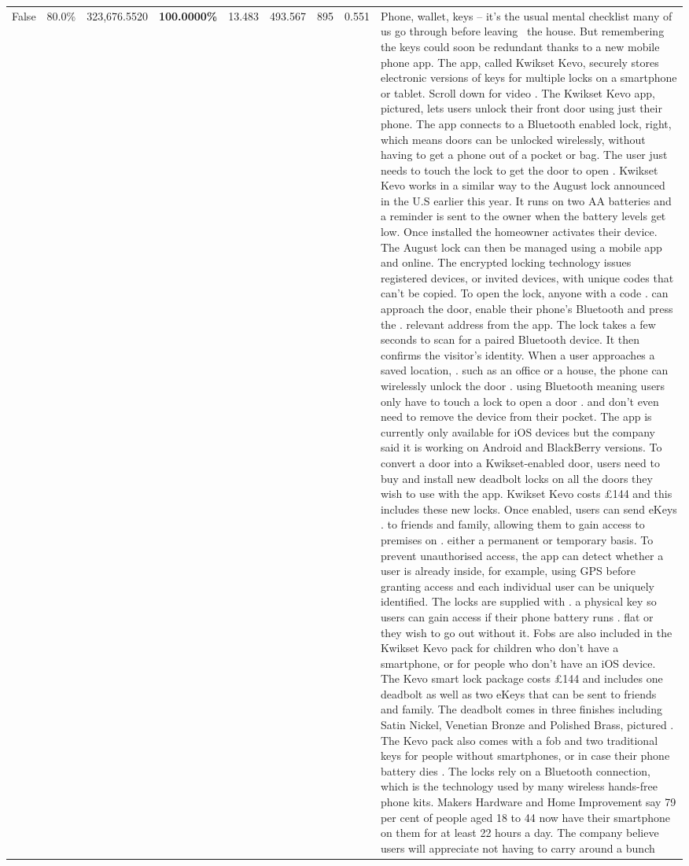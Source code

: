 \begin{table}[H]
\begin{tabular}{lllrlllll}
False & 80.0\% & 323,676.5520 & \bfseries \color{red} 100.0000\% & 13.483 & 493.567 & 895 & 0.551 & Phone, wallet, keys – it’s the usual mental checklist many of us go through before leaving  the house. But remembering the keys could soon be redundant thanks to a new mobile phone app. The app, called Kwikset Kevo, securely stores electronic versions of keys for multiple locks on a smartphone or tablet. Scroll down for video . The Kwikset Kevo app, pictured, lets users unlock their front door using just their phone. The app connects to a Bluetooth enabled lock, right, which means doors can be unlocked wirelessly, without having to get a phone out of a pocket or bag. The user just needs to touch the lock to get the door to open . Kwikset Kevo works in a similar way to the August lock announced in the U.S earlier this year. It runs on two AA batteries and a reminder is sent to the owner when the battery levels get low. Once installed the homeowner activates their device. The August lock can then be managed using a mobile app and online. The encrypted locking technology issues registered devices, or invited devices, with unique codes that can't be copied. To open the lock, anyone with a code . can approach the door, enable their phone's Bluetooth and press the . relevant address from the app. The lock takes a few seconds to scan for a paired Bluetooth device. It then confirms the visitor's identity. When a user approaches a saved location, . such as an office or a house, the phone can wirelessly unlock the door . using Bluetooth meaning users only have to touch a lock to open a door . and don't even need to remove the device from their pocket. The app is currently only available for iOS devices but the company said it is working on Android and BlackBerry versions. To convert a door into a Kwikset-enabled door, users need to buy and install new deadbolt locks on all the doors they wish to use with the app. Kwikset Kevo costs £144 and this includes these new locks. Once enabled, users can send eKeys . to friends and family, allowing them to gain access to premises on . either a permanent or temporary basis. To prevent unauthorised access, the app can detect whether a user is already inside, for example, using GPS before granting access and each individual user can be uniquely identified. The locks are supplied with . a physical key so users can gain access if their phone battery runs . flat or they wish to go out without it. Fobs are also included in the Kwikset Kevo pack for children who don't have a smartphone, or for people who don't have an iOS device. The Kevo smart lock package costs £144 and includes one deadbolt as well as two eKeys that can be sent to friends and family. The deadbolt comes in three finishes including Satin Nickel, Venetian Bronze and Polished Brass, pictured . The Kevo pack also comes with a fob and two traditional keys for people without smartphones, or in case their phone battery dies . The locks rely on a Bluetooth connection, which is the technology used by many wireless hands-free phone kits. Makers Hardware and Home Improvement say 79 per cent of people aged 18 to 44 now have their smartphone on them for at least 22 hours a day. The company believe users will appreciate not having to carry around a bunch 
\end{tabular}
\end{table}
